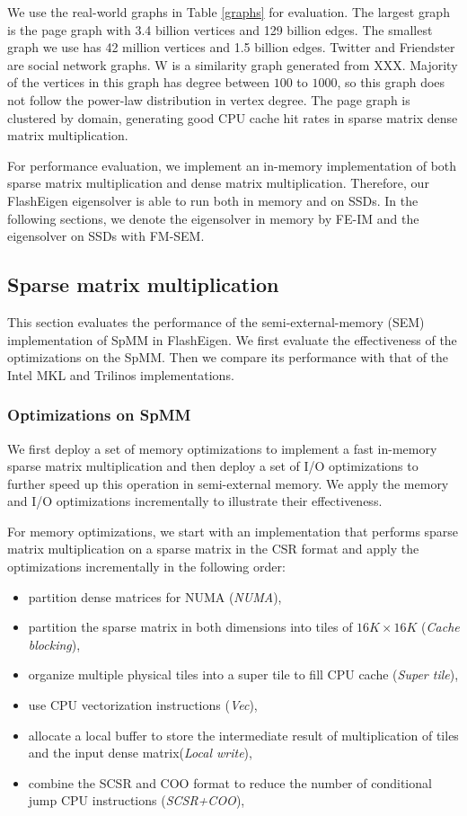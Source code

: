 We use the real-world graphs in Table \ref{graphs} for evaluation. The largest
graph is the page graph with 3.4 billion vertices and 129 billion edges.
The smallest graph we use has 42 million vertices and 1.5 billion edges.
Twitter and Friendster are social network graphs. W is a similarity graph
generated from XXX. Majority of the vertices in this graph has degree between
$100$ to $1000$, so this graph does not follow the power-law distribution
in vertex degree.
The page graph is clustered by domain, generating good CPU cache hit rates
in sparse matrix dense matrix multiplication.

For performance evaluation, we implement an in-memory implementation of both
sparse matrix multiplication and dense matrix multiplication. Therefore, our
FlashEigen eigensolver is able to run both in memory and on SSDs.
In the following sections, we denote the eigensolver in memory by FE-IM and
the eigensolver on SSDs with FM-SEM.

\subsection{Sparse matrix multiplication}
This section evaluates the performance of the semi-external-memory (SEM)
implementation of SpMM in FlashEigen. We first evaluate the effectiveness
of the optimizations on the SpMM. Then we compare its performance with that
of the Intel MKL and Trilinos implementations.

\subsubsection{Optimizations on SpMM}
We first deploy a set of memory optimizations to implement a fast
in-memory sparse matrix multiplication and then deploy a set of I/O
optimizations to further speed up this operation in semi-external memory.
We apply the memory and I/O optimizations incrementally to illustrate their
effectiveness.

For memory optimizations, we start with an implementation that performs sparse
matrix multiplication on a sparse matrix in the CSR format and apply
the optimizations incrementally in the following order:
\begin{itemize} \itemsep1pt \parskip0pt 
		\item partition dense matrices for NUMA (\textit{NUMA}),
	\item partition the sparse matrix in both dimensions into tiles of
		$16K \times 16K$ (\textit{Cache blocking}),
	\item organize multiple physical tiles into a super tile to fill CPU cache
		(\textit{Super tile}),
	\item use CPU vectorization instructions (\textit{Vec}),
	\item allocate a local buffer to store the intermediate result of
		multiplication of tiles and the input dense matrix(\textit{Local write}),
	\item combine the SCSR and COO format to reduce the number of conditional
		jump CPU instructions (\textit{SCSR+COO}),
\end{itemize}

